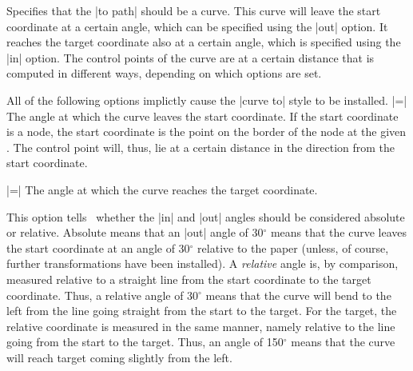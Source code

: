 \begin{itemize}
  Specifies that the |to path| should be a curve. This curve will
  leave the start coordinate at a certain angle, which can be
  specified using the |out| option. It reaches the target coordinate
  also at a certain angle, which is specified using the |in|
  option. The control points of the curve are at a certain distance
  that is computed in different ways, depending on which options are
  set.

  All of the following options implictly cause the |curve to| style to
  be installed.
  |=|
  The angle at which the curve leaves the start coordinate. If the
  start coordinate is a node, the start coordinate is the point on the
  border of the node at the given . The control point
  will, thus, lie at a certain distance in the direction 
  from the start coordinate.
\begin{codeexample}[]
\end{codeexample}
  |=|
  The angle at which the curve reaches the target coordinate.

  This option tells \tikzname\ whether the |in| and |out| angles
  should be considered absolute or relative. Absolute means that an
  |out| angle of 30$^\circ$ means that the curve leaves the start
  coordinate at an angle of 30$^\circ$ relative to the paper (unless,
  of course, further transformations have been installed). A
  \emph{relative} angle is, by comparison, measured relative to a
  straight line from the start coordinate to the target
  coordinate. Thus, a relative angle of 30$^\circ$ means that the
  curve will bend to the left from the line going straight from the
  start to the target. For the target, the relative coordinate is
  measured in the same manner, namely relative to the line going from
  the start to the target. Thus, an angle of 150$^\circ$ means that
  the curve will reach target coming slightly from the left.

\begin{codeexample}[]
\end{codeexample}


\end{itemize}
